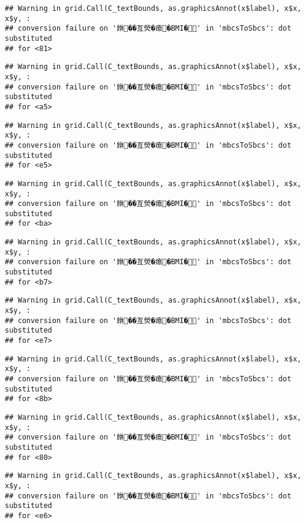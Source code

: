 \documentclass[
]{article}
\begin{document}
\begin{verbatim}
## Warning in grid.Call(C_textBounds, as.graphicsAnnot(x$label), x$x, x$y, :
## conversion failure on '銝��亙熒�瘜�BMI�' in 'mbcsToSbcs': dot substituted
## for <81>
\end{verbatim}

\begin{verbatim}
## Warning in grid.Call(C_textBounds, as.graphicsAnnot(x$label), x$x, x$y, :
## conversion failure on '銝��亙熒�瘜�BMI�' in 'mbcsToSbcs': dot substituted
## for <a5>
\end{verbatim}

\begin{verbatim}
## Warning in grid.Call(C_textBounds, as.graphicsAnnot(x$label), x$x, x$y, :
## conversion failure on '銝��亙熒�瘜�BMI�' in 'mbcsToSbcs': dot substituted
## for <e5>
\end{verbatim}

\begin{verbatim}
## Warning in grid.Call(C_textBounds, as.graphicsAnnot(x$label), x$x, x$y, :
## conversion failure on '銝��亙熒�瘜�BMI�' in 'mbcsToSbcs': dot substituted
## for <ba>
\end{verbatim}

\begin{verbatim}
## Warning in grid.Call(C_textBounds, as.graphicsAnnot(x$label), x$x, x$y, :
## conversion failure on '銝��亙熒�瘜�BMI�' in 'mbcsToSbcs': dot substituted
## for <b7>
\end{verbatim}

\begin{verbatim}
## Warning in grid.Call(C_textBounds, as.graphicsAnnot(x$label), x$x, x$y, :
## conversion failure on '銝��亙熒�瘜�BMI�' in 'mbcsToSbcs': dot substituted
## for <e7>
\end{verbatim}

\begin{verbatim}
## Warning in grid.Call(C_textBounds, as.graphicsAnnot(x$label), x$x, x$y, :
## conversion failure on '銝��亙熒�瘜�BMI�' in 'mbcsToSbcs': dot substituted
## for <8b>
\end{verbatim}

\begin{verbatim}
## Warning in grid.Call(C_textBounds, as.graphicsAnnot(x$label), x$x, x$y, :
## conversion failure on '銝��亙熒�瘜�BMI�' in 'mbcsToSbcs': dot substituted
## for <80>
\end{verbatim}

\begin{verbatim}
## Warning in grid.Call(C_textBounds, as.graphicsAnnot(x$label), x$x, x$y, :
## conversion failure on '銝��亙熒�瘜�BMI�' in 'mbcsToSbcs': dot substituted
## for <e6>
\end{verbatim}
\end{document}
